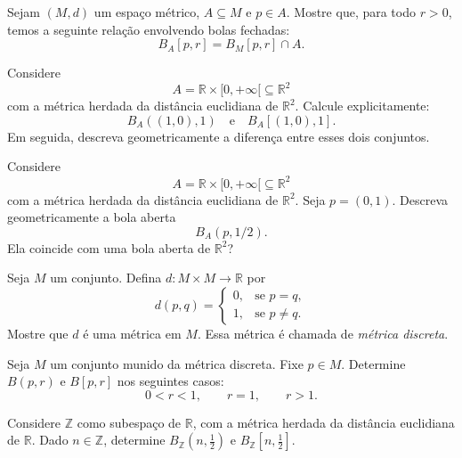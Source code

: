 \begin{exercise}
    Sejam $(M,d)$ um espaço métrico, $A\subseteq M$ e $p\in A$.
    Mostre que, para todo $r>0$, temos a seguinte relação envolvendo bolas fechadas:
    \[
        B_A[p,r]=B_M[p,r]\cap A.
    \]
\end{exercise}

\begin{exercise}
    Considere
    \[
        A=\mathbb R\times[0,+\infty[\subseteq\mathbb R^2
    \]
    com a métrica herdada da distância euclidiana de $\mathbb R^2$.
    Calcule explicitamente:
    \[
        B_A((1,0),1)
        \quad\text{e}\quad
        B_A[(1,0),1].
    \]
    Em seguida, descreva geometricamente a diferença entre esses dois conjuntos.
\end{exercise}

\begin{exercise}
    Considere
    \[
        A=\mathbb R\times[0,+\infty[\subseteq\mathbb R^2
    \]
    com a métrica herdada da distância euclidiana de $\mathbb R^2$.
    Seja $p=(0,1)$.
    Descreva geometricamente a bola aberta
    \[
        B_A(p,1/2).
    \]
    Ela coincide com uma bola aberta de $\mathbb R^2$?
\end{exercise}

\begin{exercise}
    Seja $M$ um conjunto.
    Defina $d:M\times M\to\mathbb R$ por
    \[
        d(p,q)=
        \begin{cases}
            0, & \text{se } p=q,\\
            1, & \text{se } p\neq q.
        \end{cases}
    \]
    Mostre que $d$ é uma métrica em $M$.
    Essa métrica é chamada de \emph{métrica discreta}.
\end{exercise}

\begin{exercise}
    Seja $M$ um conjunto munido da métrica discreta.
    Fixe $p\in M$.
    Determine $B(p,r)$ e $B[p,r]$ nos seguintes casos:
    \[
        0<r<1,\qquad r=1,\qquad r>1.
    \]
\end{exercise}

\begin{exercise}
    Considere $\mathbb Z$ como subespaço de $\mathbb R$, com a métrica herdada da distância euclidiana de $\mathbb R$.
    Dado $n \in \mathbb Z$, determine $B_{\mathbb Z}(n,\frac{1}{2})$ e $B_{\mathbb Z}[n,\frac{1}{2}]$.
\end{exercise}
